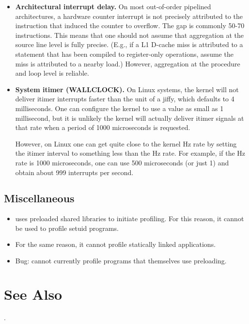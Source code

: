 \documentclass[english]{article}
\begin{document}
\begin{itemize}
\item \textbf{Architectural interrupt delay.}
On most out-of-order pipelined architectures, a hardware counter interrupt is not precisely attributed to the instruction that induced the counter to overflow.
The gap is commonly 50-70 instructions.
This means that one should not assume that aggregation at the source line level is fully precise.
(E.g., if a L1 D-cache miss is attributed to a statement that has been compiled to register-only operations, assume the miss is attributed to a nearby load.)
However, aggregation at the procedure and loop level is reliable.

\item \textbf{System itimer (WALLCLOCK).}
On Linux systems, the kernel will not deliver itimer interrupts faster than the unit of a jiffy, which defaults to 4 milliseconds.
One can configure the kernel to use a value as small as 1 millisecond, but it is unlikely the kernel will actually deliver itimer signals at that rate when a period of 1000 microseconds is requested.

However, on Linux one can get quite close to the kernel Hz rate by setting the itimer interval to something less than the Hz rate.
For example, if the Hz rate is 1000 microseconds, one can use 500 microseconds (or just 1) and obtain about 999 interrupts per second.
\end{itemize}

\subsection{Miscellaneous}

\begin{itemize}
  \item {} uses preloaded shared libraries to initiate profiling.  For this reason, it cannot be used to profile setuid programs.
  \item For the same reason, it cannot profile statically linked applications.
  \item Bug:  cannot currently profile programs that themselves use preloading.
\end{itemize}


\section{See Also}

.
\end{document}

